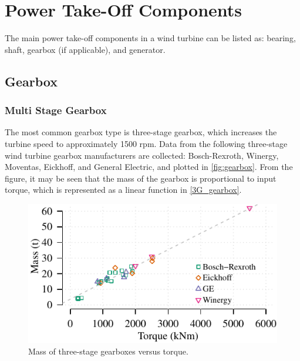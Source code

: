 \documentclass{article}\usepackage{graphicx, color}
\makeatletter
\def\maxwidth{ %
  \ifdim\Gin@nat@width>\linewidth
    \linewidth
  \else
    \Gin@nat@width
  \fi
}
\newenvironment{knitrout}{}{} %
\makeatother
\begin{document}
\section{Power Take-Off Components}

The main power take-off components in a wind turbine can be listed as: bearing, shaft, gearbox (if applicable), and generator. 

\subsection{Gearbox}

\subsubsection{Multi Stage Gearbox}

The most common gearbox type is three-stage gearbox, which increases the turbine speed to approximately 1500 rpm. 
Data from the following three-stage wind turbine gearbox manufacturers are collected: Bosch-Rexroth\cite{bosch}, Winergy\cite{winergy}, Moventas\cite{Moventas}, Eickhoff\cite{eickhoff}, and General Electric\cite{GE}, and plotted in \autoref{fig:gearbox}. From the figure, it may be seen that the mass of the gearbox is proportional to input torque, which is represented as a linear function in \autoref{3G_gearbox}. 

\begin{knitrout}
\color{fgcolor}\begin{figure}[]

\includegraphics[width=\maxwidth]{figure/gearbox} \caption[Mass of three-stage gearboxes versus torque]{Mass of three-stage gearboxes versus torque.\label{fig:gearbox}}
\end{figure}


\end{knitrout}
\end{document}
